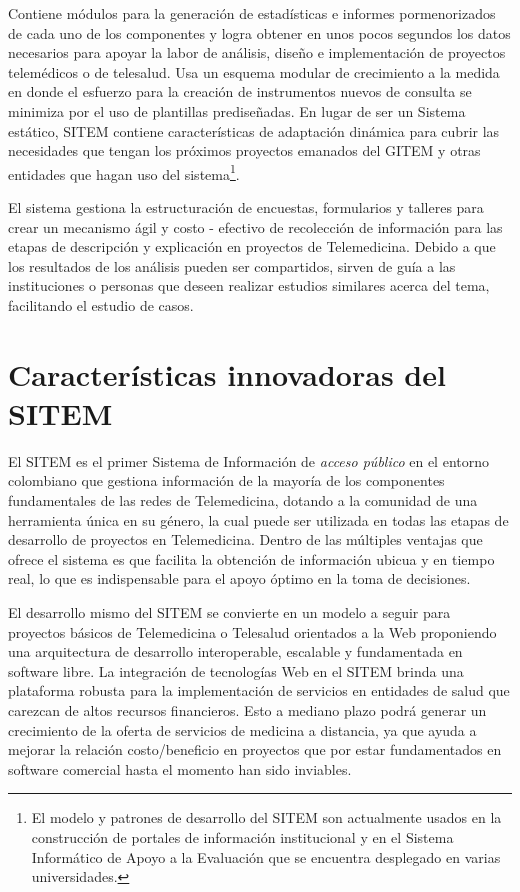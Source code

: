 Contiene módulos para la generación de estadísticas e informes pormenorizados de cada uno de los componentes y logra obtener en unos pocos segundos los datos necesarios para apoyar la labor de análisis, diseño e implementación de proyectos telemédicos o de telesalud. Usa un esquema modular de crecimiento a la medida en donde el esfuerzo para la creación de instrumentos nuevos de consulta se minimiza por el uso de plantillas prediseñadas. En lugar de ser un Sistema estático, SITEM contiene características de adaptación dinámica para cubrir las necesidades que tengan los próximos proyectos emanados del GITEM y otras entidades que hagan uso del sistema\footnote{El modelo y patrones de desarrollo del SITEM son actualmente usados en la construcción de portales de información institucional y en el Sistema Informático de Apoyo a la Evaluación que se encuentra desplegado en varias universidades.}.

El sistema gestiona la estructuración de encuestas, formularios y talleres para crear un mecanismo ágil y costo - efectivo de recolección de información para las etapas de descripción y explicación\cite{hurtado2000} en proyectos de Telemedicina. Debido a que los resultados de los análisis pueden ser compartidos, sirven de guía a las instituciones o personas que deseen realizar estudios similares acerca del tema, facilitando el estudio de casos.

\section{Características innovadoras del SITEM}

El SITEM es el primer Sistema de Información de \textit{acceso público} en el entorno colombiano que gestiona información de la mayoría de los componentes fundamentales de las redes de Telemedicina, dotando a la comunidad de una herramienta única en su género, la cual puede ser utilizada en todas las etapas de desarrollo de proyectos en Telemedicina. Dentro de las múltiples ventajas que ofrece el sistema es que facilita la obtención de información ubicua y en tiempo real, lo que es indispensable para el apoyo óptimo en la toma de decisiones. 

El desarrollo mismo del SITEM se convierte en un modelo a seguir para proyectos básicos de Telemedicina o Telesalud orientados a la Web proponiendo una arquitectura de desarrollo interoperable, escalable y fundamentada en software libre. La integración de tecnologías Web en el SITEM brinda una plataforma robusta para la implementación de servicios en entidades de salud que carezcan de altos recursos financieros. Esto a mediano plazo podrá generar un crecimiento de la oferta de servicios de medicina a distancia\cite{itu}\cite{craig2005}, ya que ayuda a mejorar la relación costo/beneficio en proyectos que por estar fundamentados en software comercial hasta el momento han sido inviables. 

